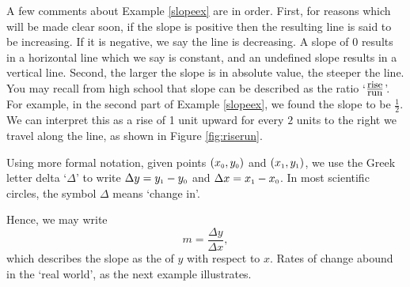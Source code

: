 \medskip

A few comments about Example \ref{slopeex} are in order.  First, for reasons which will be made clear soon, if the slope is positive then the resulting line is said to be increasing.  If it is negative, we say the line is decreasing.  A slope of $0$ results in a horizontal line which we say is constant, and an undefined slope results in a vertical line. Second, the larger the slope is in absolute value, the steeper the line.  You may recall from high school that slope can be described as the ratio `$\frac{\mbox{\small rise}}{\mbox{\small run}}$'.  For example, in the second part of Example \ref{slopeex}, we found the slope to be $\frac{1}{2}$.  We can interpret this as a rise of 1 unit upward for every $2$ units to the right we travel along the line, as shown in Figure \ref{fig:riserun}.



Using more formal notation, given points $\left(x_{\mbox{\tiny$0$}}, y_{\mbox{\tiny$0$}}\right)$ and $\left(x_{\mbox{\tiny$1$}}, y_{\mbox{\tiny$1$}}\right)$, we use the Greek letter delta `$\Delta$' to write $\Delta y = y_{\mbox{\tiny$1$}} - y_{\mbox{\tiny$0$}}$ and $\Delta x = x_{\mbox{\tiny$1$}} - x_{\mbox{\tiny$0$}}$.  In most scientific circles, the symbol $\Delta$ means `change in'.  

\smallskip

Hence, we may write \[ m = \dfrac{\Delta y}{\Delta x},\] which describes the slope as the  of $y$ with respect to $x$.  Rates of change abound in the `real world', as the next example illustrates.

\medskip

